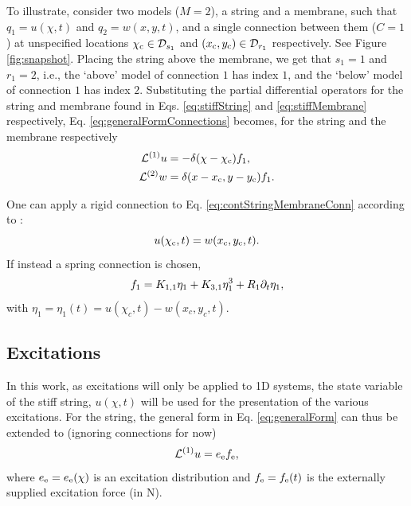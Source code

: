 \documentclass{article}
\begin{document}
  
To illustrate, consider two models ($M=2$), a string and a membrane, such that $q_1 = u(\chi ,t)$ and $q_2 = w(x,y,t)$, and a single connection between them ($C = 1$) at unspecified locations $\chi_{\text{c}} \in \mathcal{D}_{s_1}$ and $(x_{\text{c}}, y_{\text{c}}) \in \mathcal{D}_{r_1}$ respectively. See Figure \ref{fig:snapshot}. Placing the string above the membrane, we get that $s_1 = 1$ and $r_1 = 2$, i.e., the `above' model of connection $1$ has index $1$, and the `below' model of connection $1$ has index $2$. Substituting the partial differential operators for the string and membrane found in Eqs. \eqref{eq:stiffString} and \eqref{eq:stiffMembrane} respectively, Eq. \eqref{eq:generalFormConnections} becomes, for the string and the membrane respectively
\begin{subequations}
\begin{align}\label{eq:contStringMembraneConn}
        \mathcal{L}^{(1)} u &= -\delta(\chi - \chi_{\text{c}})f_1,\\
        \mathcal{L}^{(2)} w &= \delta(x - x_{\text{c}}, y-y_{\text{c}})f_1.
\end{align}
\end{subequations}

One can apply a rigid connection to Eq. \eqref{eq:contStringMembraneConn} according to \cite{theBible}: 
\begin{equation}
    u(\chi_{\text{c}}, t) = w(x_{\text{c}}, y_{\text{c}}, t).
\end{equation} 
%
If instead a spring connection is chosen,
\begin{equation}
    f_1 = K_{1, 1}\eta_1 + K_{3, 1}\eta_1^3 + R_1\partial_t \eta_1,
\end{equation}
with $\eta_1 = \eta_1(t) = u(\chi_c, t) - w(x_c, y_c, t)$.

\subsection{Excitations}\label{sec:contExcitations}
In this work, as excitations will only be applied to 1D systems, the state variable of the stiff string, $u(\chi, t)$ will be used for the presentation of the various excitations. For the string, the general form in Eq. \eqref{eq:generalForm}
can thus be extended to (ignoring connections for now)
\begin{equation}\label{eq:generalFormString}
    \mathcal{L}^{(1)} u = e_{\text{e}} f_{\text{e}},
\end{equation}
where $e_{\text{e}} = e_{\text{e}}(\chi)$ is an excitation distribution and $f_{\text{e}} = f_{\text{e}}(t)$ is the externally supplied excitation force (in N).
\end{document}
